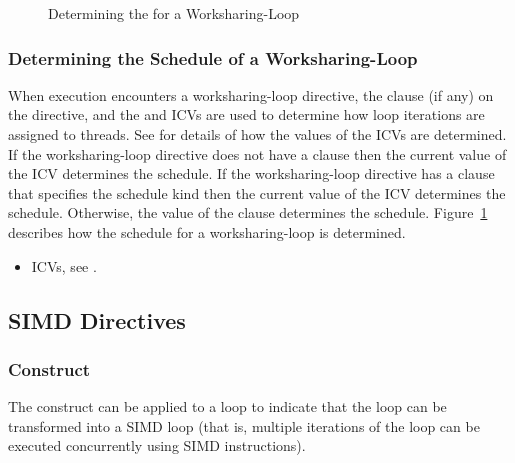 \begin{figure}[h]
\begin{quote} %

\end{quote}
\caption{Determining the  for a Worksharing-Loop\label{fig:schedule loop}}
\end{figure}



\subsubsection{Determining the Schedule of a Worksharing-Loop}
\label{subsubsec:Determining the Schedule of a Worksharing-Loop}
When execution encounters a worksharing-loop directive, the  
clause (if any) on the directive, and the  and 
 ICVs are used to determine how loop iterations are 
assigned to threads. See  for 
details of how the values of the ICVs are determined. If the worksharing-loop 
directive does not have a  clause then the current value of 
the \mbox{} ICV determines the schedule. If the 
worksharing-loop directive has a  clause that specifies 
the  schedule kind then the current value of the 
 ICV determines the schedule. Otherwise, the
value of the  clause determines the schedule. 
Figure~\ref{fig:schedule loop} describes how the schedule for a 
worksharing-loop is determined.

\crossreferences
\begin{itemize}
\item ICVs, see .
\end{itemize}



\subsection{SIMD Directives}
\label{subsec:SIMD Directives}

\subsubsection{ Construct}
\label{subsubsec:simd Construct}
\summary
The  construct can be applied to a loop to indicate that the loop 
can be transformed into a SIMD loop (that is, multiple iterations of the loop 
can be executed concurrently using SIMD instructions).

